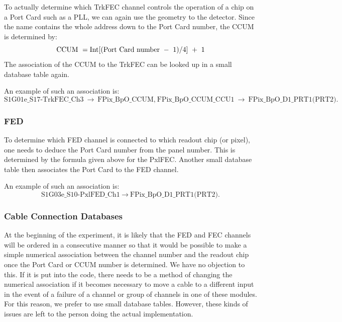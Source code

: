 \documentclass{cmspaper}
\begin{document}
To actually determine which TrkFEC channel controls the operation of a 
chip on a Port Card such as a PLL, we can again use the geometry to
the detector. Since the name contains the whole address down to the  Port 
Card number, the CCUM is determined by: 
\begin{equation}
{\rm CCUM} \ = {\rm Int} [ ({\rm Port \ Card \ number} \ - \ 1 )/ 4] \ + \ 1
\end{equation}
The association of the CCUM to the TrkFEC can be looked up in a small
database table again.

An example of such an association is:
\begin{displaymath}
\mbox{S1G01e\_S17-TrkFEC\_Ch3}\ \rightarrow\ \mbox{FPix\_BpO\_CCUM,}\ 
\mbox{FPix\_BpO\_CCUM\_CCU1}\ \rightarrow\ \mbox{FPix\_BpO\_D1\_PRT1(PRT2).}
\end{displaymath}


\subsubsection{FED}

To determine which FED channel is connected to which readout chip (or pixel), one 
needs to deduce the Port Card number from the panel number. This is determined
by the formula given above for the PxlFEC. Another small database table
then associates the Port Card to the FED channel.

An example of such an association is:
\begin{displaymath}
\mbox{S1G03e\_S10-PxlFED\_Ch1}\ \rightarrow\ \mbox{FPix\_BpO\_D1\_PRT1(PRT2).}
\end{displaymath}


\subsubsection{Cable Connection Databases}

At the beginning of the experiment, it is likely that the FED and FEC channels
will be ordered in a consecutive manner so that it would be possible to 
make a simple numerical association between the channel number and the readout chip 
once the Port Card or CCUM number is determined. 
We have no objection to this. 
If it is put into the code, there needs to be a method of changing the numerical
association if it becomes necessary to move a cable to a different input in
the event of a failure of a channel or group of channels in one of these 
modules. For this reason, we prefer to use small database tables. 
However, these kinds of issues are left to the person doing the actual implementation.
\end{document}
